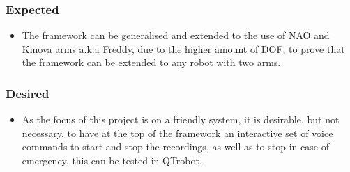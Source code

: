 \documentclass[thesis]{mas_proposal}
\begin{document}
	\subsubsection*{Expected}
	\begin{itemize}
	    \item The framework can be generalised and extended to the use of NAO and Kinova arms a.k.a Freddy, due to the higher amount of DOF, to prove that the framework can be extended to any robot with two arms.
	\end{itemize}
	\subsubsection*{Desired}
	\begin{itemize}
	    \item As the focus of this project is on a friendly system, it is desirable, but not necessary, to have at the top of the framework an interactive set of voice commands to start and stop the recordings, as well as to stop in case of emergency, this can be tested in QTrobot.
	\end{itemize}
	
	\nocite{*}
	
	
\end{document}
